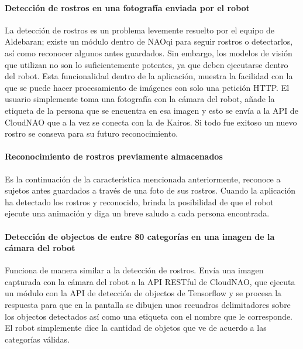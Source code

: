 \paragraph{Detección de rostros en una fotografía enviada por el robot}
\label{\detokenize{users_docs:deteccion-de-rostros-en-una-fotografia-enviada-por-el-robot}}
La detección  de rostros es un problema levemente resuelto por el equipo
de Aldebaran; existe un módulo dentro de NAOqi para seguir rostros o detectarlos,
así como reconocer algunos antes guardados. Sin embargo, los modelos de visión
que utilizan no son lo suficientemente potentes, ya que deben ejecutarse dentro
del robot. Esta funcionalidad dentro de la aplicación, muestra la facilidad con
la que se puede hacer procesamiento de imágenes con solo una petición HTTP.
El usuario simplemente toma una fotografía con la cámara del robot, añade
la etiqueta de la persona que se encuentra en esa imagen y esto se envía
a la API de CloudNAO que a la vez se conecta con la de Kairos. Si todo fue
exitoso un nuevo rostro se conseva para su futuro reconocimiento.


\paragraph{Reconocimiento de rostros previamente almacenados}
\label{\detokenize{users_docs:reconocimiento-de-rostros-previamente-almacenados}}
Es la continuación de la característica mencionada anteriormente, reconoce
a sujetos antes guardados a través de una foto de sus rostros. Cuando
la aplicación ha detectado los rostros y reconocido, brinda la posibilidad
de que el robot ejecute una animación y diga un breve saludo a cada persona
encontrada.


\paragraph{Detección de objectos de entre 80 categorías en una imagen de la cámara del robot}
\label{\detokenize{users_docs:deteccion-de-objectos-de-entre-80-categorias-en-una-imagen-de-la-camara-del-robot}}
Funciona de manera similar a la detección de rostros. Envía una imagen capturada
con la cámara del robot a la API RESTful de CloudNAO, que ejecuta un módulo
con la API de detección de objectos de Tensorflow y se procesa la respuesta para
que en la pantalla se dibujen unos
recuadros delimitadores sobre los objectos detectados así como una etiqueta
con el nombre que le corresponde. El robot simplemente
dice la cantidad de objetos que ve de acuerdo a las categorías válidas.


